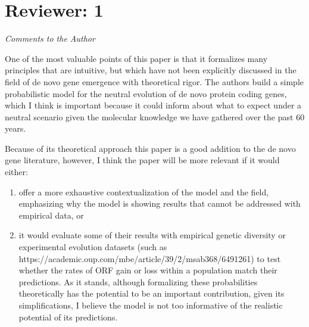 \documentclass[12pt,a4paper]{article}
\begin{document}
\onehalfspacing 

\section*{Reviewer: 1}

{\itshape Comments to the Author

One of the most valuable points of this paper is that it formalizes many principles that are intuitive, but which have not been explicitly discussed in the field of de novo gene emergence with theoretical rigor. The authors build a simple probabilistic model for the neutral evolution of de novo protein coding genes, which I think is important because it could inform about what to expect under a neutral scenario given the molecular knowledge we have gathered over the past 60 years.

Because of its theoretical approach this paper is a good addition to the de novo gene literature, however, I think the paper will be more relevant if it would either:

\begin{enumerate}
\item offer a more exhaustive contextualization of the model and the field, emphasizing why the model is showing results that cannot be addressed with empirical data, or

\item it would evaluate some of their results with empirical genetic diversity or experimental evolution datasets (such as https://academic.oup.com/mbe/article/39/2/msab368/6491261) to test whether the rates of ORF gain or loss within a population match their predictions. As it stands, although formalizing these probabilities theoretically has the potential to be an important contribution, given its simplifications, I believe the model is not too informative of the realistic potential of its predictions.
\end{enumerate}
}
\end{document}
